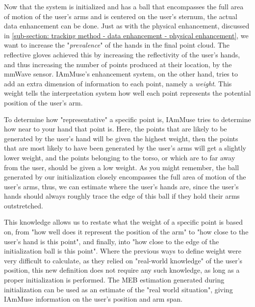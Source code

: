 Now that the system is initialized and has a ball that encompasses the full area of motion of the user's arms and is centered on the user's sternum, the actual data enhancement can be done.
Just as with the physical enhancement, discussed in \cref{sub-section: tracking method - data enhancement - physical enhancement}, we want to increase the "\textit{prevalence}" of the hands in the final point cloud.
The reflective gloves achieved this by increasing the reflectivity of the user's hands, and thus increasing the number of points produced at their location, by the mmWave sensor.
IAmMuse's enhancement system, on the other hand, tries to add an extra dimension of information to each point, namely a \textit{weight}.
This weight tells the interpretation system how well each point represents the potential position of the user's arm.

To determine how "representative" a specific point is, IAmMuse tries to determine how near to your hand that point is.
Here, the points that are likely to be generated by the user's hand will be given the highest weight, then the points that are most likely to have been generated by the user's arms will get a slightly lower weight, and the points belonging to the torso, or which are to far away from the user, should be given a low weight.
As you might remember, the ball generated by our initialization closely encompasses the full area of motion of the user's arms, thus, we can estimate where the user's hands are, since the user's hands should always roughly trace the edge of this ball if they hold their arms outstretched.

This knowledge allows us to restate what the weight of a specific point is based on, from "how well does it represent the position of the arm" to "how close to the user's hand is this point", and finally, into "how close to the edge of the initialization ball is this point".
Where the previous ways to define weight were very difficult to calculate, as they relied on "real-world knowledge" of the user's position, this new definition does not require any such knowledge, as long as a proper initialization is performed.
The MEB estimation generated during initialization can be used as an estimate of the "real world situation", giving IAmMuse information on the user's position and arm span.

